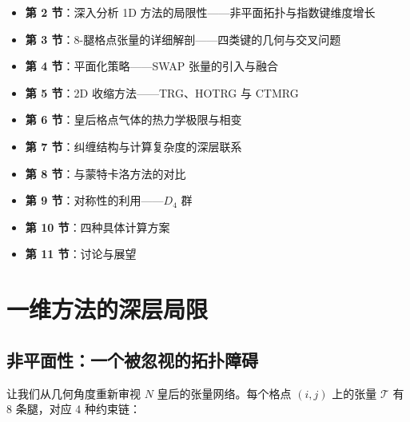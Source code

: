 \documentclass[12pt,a4paper]{ctexart}
\begin{document}
\begin{itemize}
\item \textbf{第 2 节}：深入分析 1D 方法的局限性——非平面拓扑与指数键维度增长
\item \textbf{第 3 节}：8-腿格点张量的详细解剖——四类键的几何与交叉问题
\item \textbf{第 4 节}：平面化策略——SWAP 张量的引入与融合
\item \textbf{第 5 节}：2D 收缩方法——TRG、HOTRG 与 CTMRG
\item \textbf{第 6 节}：皇后格点气体的热力学极限与相变
\item \textbf{第 7 节}：纠缠结构与计算复杂度的深层联系
\item \textbf{第 8 节}：与蒙特卡洛方法的对比
\item \textbf{第 9 节}：对称性的利用——$D_4$ 群
\item \textbf{第 10 节}：四种具体计算方案
\item \textbf{第 11 节}：讨论与展望
\end{itemize}


\section{一维方法的深层局限}

\subsection{非平面性：一个被忽视的拓扑障碍}

让我们从几何角度重新审视 $N$ 皇后的张量网络。每个格点 $(i,j)$ 上的张量 $\mathcal{T}$ 有 8 条腿，对应 4 种约束链：
\end{document}
